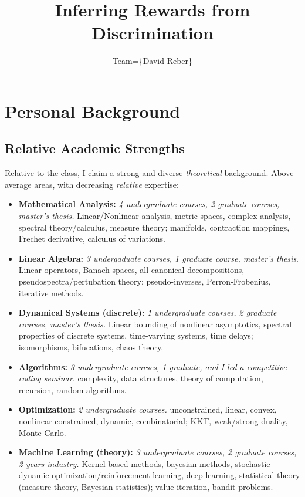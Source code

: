 \documentclass[letterpaper,10pt]{article}
\begin{document}
\title{Inferring Rewards from Discrimination}

\author{Team=\{David Reber\}}





\section{Personal Background}

\subsection{Relative Academic Strengths}
Relative to the class, I claim a strong and diverse \emph{theoretical} background. Above-average areas, with decreasing \emph{relative} expertise:
\begin{itemize}
  \item \textbf{Mathematical Analysis:} \emph{4 undergraduate courses, 2 graduate courses, master's thesis.} Linear/Nonlinear analysis, metric spaces, complex analysis, spectral theory/calculus, measure theory; manifolds, contraction mappings, Frechet derivative, calculus of variations.
  \item \textbf{Linear Algebra:} \emph{3 undergaduate courses, 1 graduate course, master's thesis}. Linear operators, Banach spaces, all canonical decompositions, pseudospectra/pertubation theory; pseudo-inverses, Perron-Frobenius, iterative methods.
  \item \textbf{Dynamical Systems (discrete):} \emph{1 undergraduate courses, 2 graduate courses, master's thesis.} Linear bounding of nonlinear asymptotics, spectral properties of discrete systems, time-varying systems, time delays; isomorphisms, bifucations, chaos theory.
  \item \textbf{Algorithms:} \emph{3 undergraduate courses, 1 graduate, and I led a competitive coding seminar.} complexity, data structures, theory of computation, recursion, random algorithms.
  \item \textbf{Optimization:} \emph{2 undergraduate courses.} unconstrained, linear, convex, nonlinear constrained, dynamic, combinatorial; KKT, weak/strong duality, Monte Carlo.
  \item \textbf{Machine Learning (theory):} \emph{3 undergraduate courses, 2 graduate courses, 2 years industry.} Kernel-based methods, bayesian methods, stochastic dynamic optimization/reinforcement learning, deep learning, statistical theory (measure theory, Bayesian statistics); value iteration, bandit problems.
\end{itemize}
\end{document}
